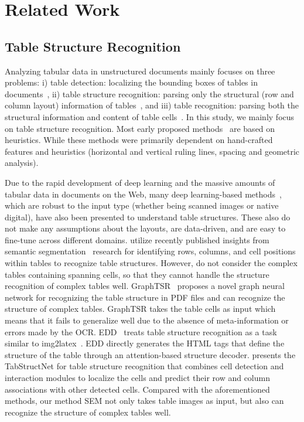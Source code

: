 \documentclass[review]{elsarticle}
\begin{document}
\section{Related Work}
\subsection{Table Structure Recognition}
Analyzing tabular data in unstructured documents mainly focuses on three problems: i) table detection: localizing the bounding boxes of tables in documents~\cite{Icdar-2013-Comp, Icdar-2019-Comp}, ii) table structure recognition: parsing only the structural (row and column layout) information of tables~\cite{DeepDeSRT, TabStructNet, SPLERGE}, and iii) table recognition: parsing
both the structural information and content of table cells~\cite{EDD}. In this study, we mainly focus on table structure recognition. Most early proposed methods~\cite{TSR-h1, TSR-h2, TSR-h3} are based on heuristics. While these methods were primarily dependent on hand-crafted features and heuristics (horizontal and vertical ruling lines, spacing and geometric analysis). 

Due to the rapid development of deep learning and the massive amounts of tabular data in documents on the Web, many deep learning-based methods~\cite{DeepDeSRT, EDD, TabStructNet, GraphTSR, SemanticSegmTSR}, which are robust to the input type (whether being scanned images or native digital), have also been presented to understand table structures. These also do not make any assumptions about the layouts, are data-driven, and are easy to fine-tune across different domains. \cite{DeepDeSRT, SemanticSegmTSR} utilize recently published insights from semantic segmentation~\cite{FCN} research for identifying rows, columns, and cell positions within tables to recognize table structures. However, \cite{DeepDeSRT, SemanticSegmTSR} do not consider the complex tables containing spanning cells, so that they cannot handle the structure recognition of complex tables well. GraphTSR~\cite{GraphTSR} proposes a novel graph neural network for recognizing the table structure in PDF files and can recognize the structure of complex tables. GraphTSR takes the table cells as input which means that it fails to generalize well due to the absence of meta-information or errors made by the OCR. EDD~\cite{EDD} treats table structure recognition as a task similar to img2latex~\cite{WAP, TreeDecoder}. EDD directly generates the HTML tags that define the structure of the table through an attention-based structure decoder. \cite{TabStructNet} presents the TabStructNet for table structure recognition that combines cell detection and interaction modules to localize the cells and predict their row and column associations with other detected cells. Compared with the aforementioned methods, our method SEM not only takes table images as input, but also can recognize the structure of complex tables well.
\end{document}
